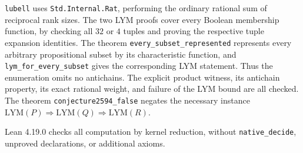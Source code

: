 \documentclass[10pt]{article}
\begin{document}
\texttt{lubell} uses \texttt{Std.Internal.Rat}, performing the ordinary
rational sum of reciprocal rank sizes. The two LYM proofs cover every
Boolean membership function, by checking all $32$ or $4$ tuples and proving
the respective tuple expansion identities. The theorem
\texttt{every\_\allowbreak{}subset\_\allowbreak{}represented} represents every arbitrary
propositional subset by its characteristic function, and
\texttt{lym\_\allowbreak{}for\_\allowbreak{}every\_\allowbreak{}subset} gives the corresponding LYM statement.
Thus the enumeration omits no antichains. The explicit product witness,
its antichain property, its exact rational weight, and failure of the
LYM bound are all checked. The theorem
\texttt{conjecture2594\_\allowbreak{}false} negates the necessary instance
$\mathrm{LYM}(P)\Rightarrow\mathrm{LYM}(Q)\Rightarrow\mathrm{LYM}(R)$.

Lean 4.19.0 checks all computation by kernel reduction, without
\texttt{native\_\allowbreak{}decide}, unproved declarations, or additional axioms.
\end{document}
